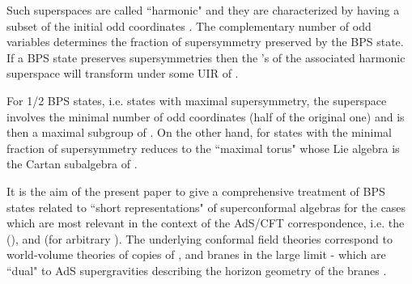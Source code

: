 \documentclass[a4paper,12pt]{article}
\begin{document}
Such superspaces are called ``harmonic" \cite{GIK1} and they are 
characterized by having a subset of the initial odd coordinates 
\myHighlight{$\theta$}\coordHE{}. The complementary number of odd variables determines the 
fraction of supersymmetry preserved by the BPS state. If a BPS 
state preserves \coordHE{} supersymmetries then the \myHighlight{$\theta$}\coordHE{}'s of the 
associated harmonic superspace will transform under some UIR of 
\coordHE{}. 

For 1/2 BPS states, i.e. states with maximal supersymmetry, the 
superspace involves the minimal number of odd coordinates (half of 
the original one) and \coordHE{} is then a maximal subgroup of \coordHE{}. On 
the other hand, for states with the minimal fraction of 
supersymmetry \coordHE{} reduces to the ``maximal torus" whose Lie 
algebra is the Cartan subalgebra of \coordHE{}. 

It is the aim of the present paper to give a comprehensive 
treatment of BPS states related to ``short representations" of 
superconformal algebras for the cases which are most relevant in 
the context of the AdS/CFT correspondence, i.e. the \coordHE{} 
(\coordHE{}), \coordHE{} and \coordHE{} (for arbitrary \coordHE{}). The underlying 
conformal field theories correspond to world-volume theories of 
\coordHE{} copies of \coordHE{}, \coordHE{} and \coordHE{} branes in the large \coordHE{} 
limit \cite{AOY}-\cite{ckvp} which are ``dual" to AdS 
supergravities describing the horizon geometry of the branes 
\cite{AGMOO}. 
\end{document}
